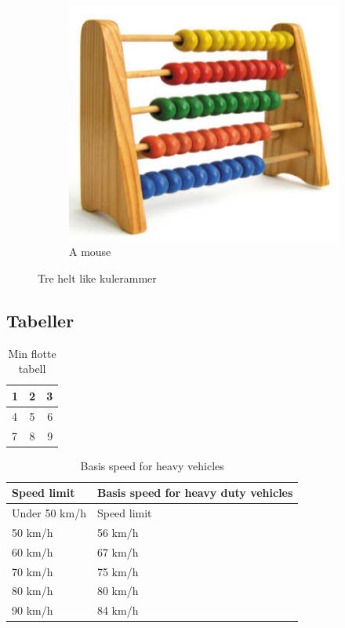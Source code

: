 \documentclass[a4paper]{article}
\begin{document}
\begin{figure}[h]
\begin{subfigure}[b]{0.3\linewidth}
        \label{fig:tiger}
    \end{subfigure}
    ~ 
    \begin{subfigure}[b]{0.3\linewidth}
        \includegraphics[width=\textwidth]{kuleramme}
        \caption{A mouse}
        \label{fig:mouse}
    \end{subfigure}
    \caption{Tre helt like kulerammer}\label{fig:animals}
\end{figure}

\pagebreak

\subsection{Tabeller}

\begin{table}[h]
    \centering
    \begin{tabular}{ l | c | r }
      1 & 2 & 3 \\ \hline
      4 & 5 & 6 \\ \hline
      7 & 8 & 9 \\ 
    \end{tabular}
    \caption{Min flotte tabell}
    \label{tab:tabell1}
\end{table}

\begin{table}[h!]
    \centering
    \begin{tabular}{| l | l |}
    \hline
    Speed limit & Basis speed for heavy duty vehicles \\ \hline \hline
    Under 50 km/h & Speed limit \\ \hline
    50 km/h & 56 km/h \\ \hline
    60 km/h & 67 km/h \\ \hline
    70 km/h & 75 km/h \\ \hline
    80 km/h & 80 km/h \\ \hline
    90 km/h & 84 km/h \\ \hline
    \end{tabular}
    \caption{Basis speed for heavy vehicles}
    \label{table:referencespeed}
\end{table}
\end{document}
